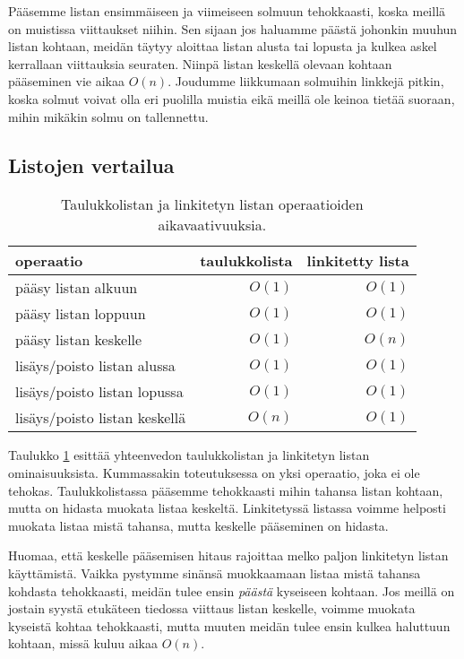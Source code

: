 Pääsemme listan ensimmäiseen ja viimeiseen solmuun tehokkaasti,
koska meillä on muistissa viittaukset niihin.
Sen sijaan jos haluamme päästä johonkin muuhun listan kohtaan,
meidän täytyy aloittaa listan alusta tai lopusta ja kulkea askel
kerrallaan viittauksia seuraten.
Niinpä listan keskellä olevaan kohtaan pääseminen vie aikaa $O(n)$.
Joudumme liikkumaan solmuihin linkkejä pitkin, koska solmut voivat
olla eri puolilla muistia eikä meillä ole keinoa tietää suoraan,
mihin mikäkin solmu on tallennettu.

\subsection{Listojen vertailua}

\begin{table}
\center
\begin{tabular}{lrr}
operaatio & taulukkolista & linkitetty lista \\
\hline
pääsy listan alkuun & $O(1)$ & $O(1)$ \\
pääsy listan loppuun & $O(1)$ & $O(1)$ \\ 
pääsy listan keskelle &  $O(1)$ & $O(n)$ \\
lisäys/poisto listan alussa & $O(1)$ & $O(1)$ \\
lisäys/poisto listan lopussa & $O(1)$ & $O(1)$ \\ 
lisäys/poisto listan keskellä &  $O(n)$ & $O(1)$ \\
\end{tabular}
\caption{Taulukkolistan ja linkitetyn listan operaatioiden
aikavaativuuksia.}
\label{tab:taulin}
\end{table}

Taulukko \ref{tab:taulin} esittää yhteenvedon taulukkolistan ja
linkitetyn listan ominaisuuksista.
Kummassakin toteutuksessa on yksi operaatio,
joka ei ole tehokas.
Taulukkolistassa pääsemme tehokkaasti mihin tahansa listan
kohtaan, mutta on hidasta muokata listaa keskeltä.
Linkitetyssä listassa voimme helposti muokata listaa mistä tahansa,
mutta keskelle pääseminen on hidasta.

Huomaa, että keskelle pääsemisen hitaus rajoittaa melko paljon
linkitetyn listan käyttämistä.
Vaikka pystymme sinänsä muokkaamaan listaa mistä tahansa kohdasta
tehokkaasti, meidän tulee ensin \emph{päästä} kyseiseen kohtaan.
Jos meillä on jostain syystä etukäteen tiedossa viittaus listan keskelle,
voimme muokata kyseistä kohtaa tehokkaasti,
mutta muuten meidän tulee ensin kulkea haluttuun kohtaan,
missä kuluu aikaa $O(n)$.

